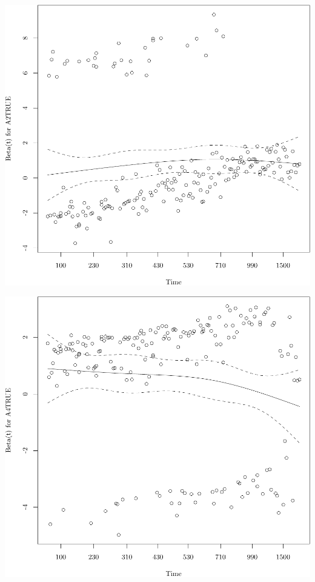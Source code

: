 \documentclass{article}\usepackage[]{graphicx}\usepackage[]{color}
\makeatletter
\def\maxwidth{ %
  \ifdim\Gin@nat@width>\linewidth
    \linewidth
  \else
    \Gin@nat@width
  \fi
}
\newenvironment{knitrout}{}{} %
\makeatother
\begin{document}
\begin{knitrout}
{\centering \includegraphics[width=\maxwidth]{figure/05-eda-ph-check-reduced-2-2} 

}




{\centering \includegraphics[width=\maxwidth]{figure/05-eda-ph-check-reduced-2-3} 

}



\end{knitrout}
\end{document}
